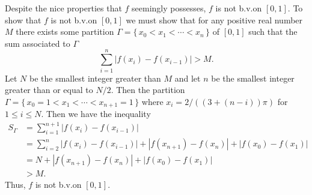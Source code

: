 \begin{solution}
  Despite the nice properties that $f$ seemingly possesses, $f$ is not
  b.v.\@ on $[0,1]$. To show that $f$ is not b.v.\@ on $[0,1]$ we must show
  that for any positive real number $M$ there exists some partition
  $\Gamma=\{\,x_0<x_1<\cdots<x_n\,\}$ of $[0,1]$ such that the sum
  associated to $\Gamma$
  \[
    \sum_{i=1}^n|f(x_i)-f(x_{i-1})|>M.
  \]
  Let $N$ be the smallest integer greater than $M$ and let $n$ be the
  smallest integer greater than or equal to $N/2$. Then the partition
  $\Gamma=\{\,x_0=1<x_1<\cdots<x_{n+1}=1\,\}$ where
  $x_i=2/((3+(n-i))\pi)$ for
  $1\leq i\leq N$. Then we have the inequality
  \begin{align*}
    S_\Gamma
    &=\sum_{i=1}^{n+1}|f(x_i)-f(x_{i-1})|\\
    &=\sum_{i=2}^n
      |f(x_i)-f(x_{i-1})|+|f(x_{n+1})-f(x_n)|+|f(x_0)-f(x_1)|\\
    &=N+|f(x_{n+1})-f(x_n)|+|f(x_0)-f(x_1)|\\
    &>M.
  \end{align*}
  Thus, $f$ is not b.v.\@ on $[0,1]$.
\end{solution}

